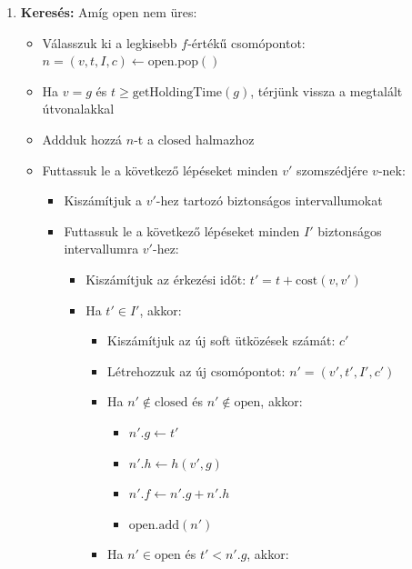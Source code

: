 \documentclass[a4paper,12pt]{article}
\begin{document}
\begin{enumerate}
    \item \textbf{Keresés:}
    Amíg $\text{open}$ nem üres:
    \begin{itemize}
        \item Válasszuk ki a legkisebb $f$-értékű csomópontot: $n = (v, t, I, c) \gets \text{open}.\text{pop}()$
        \item Ha $v = g$ és $t \geq \text{getHoldingTime}(g)$, térjünk vissza a megtalált útvonalakkal
        \item Addduk hozzá $n$-t a $\text{closed}$ halmazhoz
        \item Futtassuk le a következő lépéseket minden $v'$ szomszédjére $v$-nek:
            \begin{itemize}
                \item Kiszámítjuk a $v'$-hez tartozó biztonságos intervallumokat
                \item Futtassuk le a következő lépéseket minden $I'$ biztonságos intervallumra $v'$-hez:
                    \begin{itemize}
                        \item Kiszámítjuk az érkezési időt: $t' = t + \text{cost}(v, v')$
                        \item Ha $t' \in I'$, akkor:
                            \begin{itemize}
                                \item Kiszámítjuk az új soft ütközések számát: $c'$
                                \item Létrehozzuk az új csomópontot: $n' = (v', t', I', c')$
                                \item Ha $n' \notin \text{closed}$ és $n' \notin \text{open}$, akkor:
                                    \begin{itemize}
                                        \item $n'.g \gets t'$
                                        \item $n'.h \gets h(v', g)$
                                        \item $n'.f \gets n'.g + n'.h$
                                        \item $\text{open}.\text{add}(n')$
                                    \end{itemize}
                                \item Ha $n' \in \text{open}$ és $t' < n'.g$, akkor:
                                    \begin{itemize}

\end{itemize}
\end{itemize}
\end{itemize}
\end{itemize}
\end{itemize}
\end{enumerate}
\end{document}
